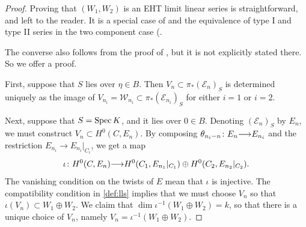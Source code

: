 \documentclass[11pt,reqno]{amsart}
\theoremstyle{plain}
\theoremstyle{definition}
\theoremstyle{remark}
\numberwithin{equation}{section}
\renewcommand{\to}{{\longrightarrow}}
\numberwithin{equation}{section}
\begin{document}
\begin{proof}
  Proving that $(W_1, W_2)$ is an EHT limit linear series is straightforward, and left to the reader.
  It is a special case of \cite[Theorem~4.3.4]{oss:14} and the equivalence of type I and type II series in the two component case (\cite[Remark~3.4.15]{oss:14}.

  The converse also follows from the proof of \cite[Theorem~4.3.4]{oss:14}, but it is not explicitly stated there.
  So we offer a proof.
  
  First, suppose that $S$ lies over $\eta \in B$.
  Then $V_n \subset \pi_* (\mathcal E_n)_S$ is determined uniquely as the image of $V_{n_i} = \mathcal W_{n_i} \subset \pi_* (\mathcal E_{n_i})_S$ for either $i = 1$ or $i = 2$.

  Next, suppose that $S = \operatorname{Spec} K$, and it lies over $0 \in B$.
  Denoting $(\mathcal E_n)_S$ by $E_n$, we must construct $V_n \subset H^0(C, E_n)$.
  By composing $\theta_{n_i-n} \from E_n \to E_{n_i}$ and the restriction $E_{n_i} \to E_{n_i}|_{C_i}$, we get a map
  \[ \iota \from H^0(C, E_n) \to H^0(C_1, E_{n_1}|_{C_1}) \oplus H^0(C_2, E_{n_2}|_{C_2}). \]
  The vanishing condition on the twists of $E$ mean that $\iota$ is injective.
  The compatibility condition in \autoref{def:lls} implies that we must choose $V_n$ so that $\iota (V_n) \subset W_1 \oplus W_2$.
  We claim that $\dim \iota^{-1}(W_1 \oplus W_2) = k$, so that there is a unique choice of $V_n$, namely $V_n = \iota^{-1}(W_1 \oplus W_2)$.


\end{proof}
\end{document}
